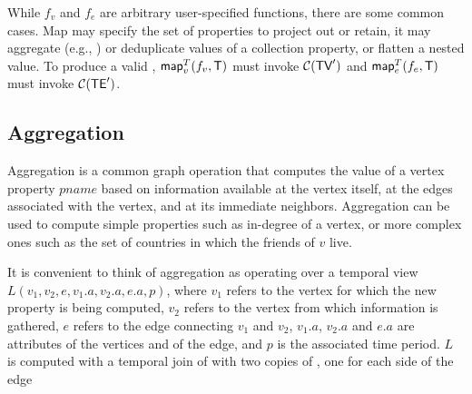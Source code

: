 
While $f_v$ and $f_e$ are arbitrary user-specified functions, there
are some common cases.  Map may specify the set of properties to
project out or retain, it may aggregate (e.g., ) or
deduplicate values of a collection property, or flatten a nested
value.
%
To produce a valid \tg, $\textsf{map}^T_v(f_v, \mathsf{T})$ must invoke $\mathcal{C}(\textsf{TV}')$
and $\textsf{map}^T_e(f_e, \mathsf{T})$ must invoke $\mathcal{C}(\textsf{TE}')$.



\subsection{Aggregation}
\label{sec:algebra:agg}

Aggregation is a common graph operation that computes the value of a
vertex property $pname$ based on information available at the vertex
itself, at the edges associated with the vertex, and at its immediate
neighbors.  Aggregation can be used to compute simple properties such
as in-degree of a vertex, or more complex ones such as the set of
countries in which the friends of $v$ live.

It is convenient to think of aggregation as operating over a temporal
view $L(v_1,v_2,e,v_1.a,v_2.a,e.a,p)$, where $v_1$ refers to the
vertex for which the new property is being computed, $v_2$ refers to
the vertex from which information is gathered, $e$ refers to the edge
connecting $v_1$ and $v_2$, $v_1.a$, $v_2.a$ and $e.a$ are attributes
of the vertices and of the edge, and $p$ is the associated time
period.  $L$ is computed with a temporal join of \te with two copies
of \tv, one for each side of the edge

